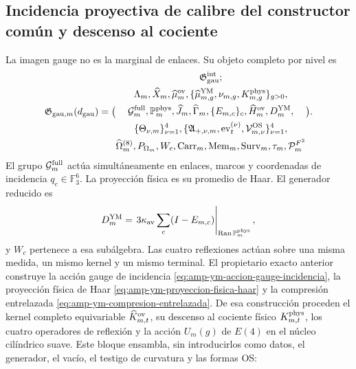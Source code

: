 
\subsection{Incidencia proyectiva de calibre del constructor común y descenso al cociente}

La imagen gauge no es la marginal de enlaces. Su objeto completo por nivel es
\begin{equation}\label{eq:pdf2-g-gau-explicito}
 \mathfrak G_{{\rm gau},m}(d_{\rm gau})=
 \bigl(
 \begin{gathered}
  \mathfrak G_{\rm gau}^{\rm int};\\
  \Lambda_m,\widehat X_m,\widehat\mu_m^{\rm ov},
  \{\widehat\mu_{m,g}^{\rm YM},\nu_{m,g},K_{m,g}^{\rm phys}\}_{g>0},\\
  \mathcal G_m^{\rm full},\mathbb P_m^{\rm phys},
  \widehat J_m,\widehat\Gamma_m,
  \{E_{m,c}\}_c,\widehat H_m^{\rm ov},D_m^{\rm YM},\\
  \{\Theta_{\nu,m}\}_{\nu=1}^4,
  \{\mathfrak A_{+,\nu,m},\operatorname{ev}_{t}^{(\nu)},
      \mathcal V_{m,\nu}^{\rm OS}\}_{\nu=1}^4,\\
  \widehat\Omega_m^{(8)},P_{\Omega_m},W_c,
  \operatorname{Carr}_m,\operatorname{Mem}_m,
  \operatorname{Surv}_m,\tau_m,\mathcal P_m^{F^2}
 \end{gathered}
 \bigr).
\end{equation}
El grupo $\mathcal G_m^{\rm full}$ actúa simultáneamente en enlaces, marcos y
coordenadas de incidencia $q_c\in\mathbb F_3^6$. La proyección física es su promedio
de Haar. El generador reducido es
\begin{equation}\label{eq:pdf2-g-gau-generador-estructural}
 D_m^{\rm YM}
 =\left.3\kappa_{\rm av}\sum_c(I-E_{m,c})
  \right|_{\operatorname{Ran}\mathbb P_m^{\rm phys}},
\end{equation}
y $W_c$ pertenece a esa subálgebra. Las cuatro reflexiones actúan sobre una misma
medida, un mismo kernel y un mismo terminal.
El propietario exacto anterior construye la acción gauge de incidencia
\eqref{eq:amp-ym-accion-gauge-incidencia}, la proyección física de Haar
\eqref{eq:amp-ym-proyeccion-fisica-haar} y la compresión entrelazada
\eqref{eq:amp-ym-compresion-entrelazada}. De esa construcción proceden el
kernel completo equivariable $\widehat K_{m,t}^{\rm ov}$, su descenso al
cociente físico $K_{m,t}^{\rm phys}$, los cuatro operadores de reflexión y
la acción $U_m(g)$ de $E(4)$ en el núcleo cilíndrico suave. Este bloque
ensambla, sin introducirlos como datos, el generador, el vacío, el testigo
de curvatura y las formas OS:
